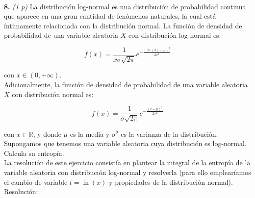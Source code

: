 \documentclass{article}
\begin{document}
~\\
\textbf{8.} \textit{(1 p)} La distribución log-normal es una distribución de probabilidad continua que aparece en una gran cantidad de fenómenos naturales, la cual está íntimamente relacionada con la distribución normal. La función de densidad de probabilidad de una variable aleatoria $X$ con distribución log-normal es:

$$
f(x)=\frac{1}{x\sigma\sqrt{2\pi}}e^{-\frac{(\ln\left(x\right)-\mu)^2}{2\sigma^2}}
$$

con $x\in\left(0,+\infty\right)$.\\

Adicionalmente, la función de densidad de probabilidad de una variable aleatoria $X$ con distribución normal es:

$$
f(x)=\frac{1}{\sigma\sqrt{2\pi}}e^{-\frac{(x-\mu)^2}{2\sigma^2}}
$$

con $x\in\mathbb{R}$, y donde $\mu$ es la media y $\sigma^2$ es la varianza de la distribución.\\

Supongamos que tenemos una variable aleatoria cuya distribución es log-normal. Calcula su entropía.\\

La resolución de este ejercicio consistía en plantear la integral de la entropía de la variable aleatoria con distribución log-normal y resolverla (para ello emplearíamos el cambio de variable $t=\ln(x)$ y propiedades de la distribución normal). Resolución:
\end{document}
